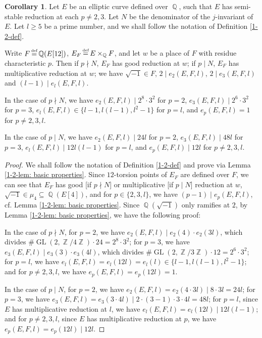 \documentclass[a4paper, 12pt]{article}
\DeclareMathOperator{\defeq}{\overset{\text{\tiny{def}}}{=}}
\DeclareMathOperator{\Z}{\mathbb{Z}}
\DeclareMathOperator{\Q}{\mathbb{Q}}
\DeclareMathOperator{\GL}{\text{GL}}
\numberwithin{equation}{section}
\theoremstyle{definition}
\newtheorem{cor}[thm]{Corollary}
\begin{document}
\begin{cor} \label{1-2-cor0}
Let $E$ be an elliptic curve defined over $\Q$, such that $E$ has semi-stable reduction at each $p\neq 2,3$.
Let $N$ be the denominator of the $j$-invariant of $E$.
Let $l\ge 5$ be a prime number, and we shall follow the notation of Definition \ref{1-2-def}.

Write $F\defeq \Q(E[12])$, $E_F \defeq E\times_{\Q} F$, and let $w$ be a place of $F$ with residue characteristic $p$. 
Then if $p \nmid N$, $E_F$ has good reduction at $w$; if $p \mid N$, $E_F$ has multiplicative reduction at $w$; we have $\sqrt{-1} \in F$, $2\mid e_2(E,F,l)$, $2\mid e_3(E,F,l)$ and $(l-1) \mid e_l(E,F,l)$.

In the case of $p \nmid N$, we have 
$e_2(E,F,l) \mid 2^8\cdot 3^2$ for $p=2$, $e_3(E,F,l) \mid 2^6\cdot 3^2$ for $p=3$, 
$e_l(E,F,l) \in \{l-1, l(l-1), l^2-1\}$ for $p=l$, and $e_p(E,F,l) = 1$ for $p\neq 2,3,l$.
 
In the case of $p \mid N$, we have
$e_2(E,F,l) \mid 24l$ for $p=2$, $e_3(E,F,l) \mid 48l$ for $p=3$, 
$e_l(E,F,l) \mid 12 l (l-1)$ for $p=l$, 
and $e_p(E,F,l) \mid 12l$ for $p\neq 2,3,l$.
\end{cor}
\begin{proof}
We shall follow the notation of Definition \ref{1-2-def} and prove via Lemma \ref{1-2-lem: basic properties}.
Since $12$-torsion points of $E_F$ are defined over $F$, we can see that $E_F$ has good [if $p\nmid N$] or multiplicative [if $p\mid N$] reduction at $w$, $\sqrt{-1}\in \mu_4 \subseteq \Q(E[4])$, and for $p\in\{2,3,l\}$, we have $(p-1) \mid e_p(E,F,l)$, cf.  Lemma \ref{1-2-lem: basic properties}.
Since $\Q(\sqrt{-1})$ only ramifies at $2$, by Lemma \ref{1-2-lem: basic properties}, we have the following proof:

In the case of $p\nmid N$, 
for $p=2$, we have $e_2(E,F,l) \mid e_2(4) \cdot e_2(3l)$, which divides $\#\GL(2,\Z/4\Z) \cdot 24 = 2^8 \cdot 3^2$;
for $p=3$, we have  $e_3(E,F,l) \mid e_3(3) \cdot e_3(4l)$, which divides $\#\GL(2,\Z/3\Z) \cdot 12 = 2^6 \cdot 3^2$;
for $p=l$, we have $e_l(E,F,l) = e_l(12l) = e_l(l) \in \{ l-1, l(l-1), l^2-1\}$;
and for $p\neq 2,3,l$, we have $e_p(E,F,l) = e_p(12l) = 1$.

In the case of $p\mid N$, 
for $p=2$, we have $e_2(E,F,l) = e_2(4\cdot 3l) \mid 8 \cdot 3l = 24l$;
for $p=3$, we have $e_3(E,F,l) = e_3(3\cdot 4l) \mid 2\cdot (3-1)\cdot 3 \cdot 4l = 48l$;
for $p=l$, since $E$ has multiplicative reduction at $l$, we have $e_l(E,F,l) = e_l(12l) \mid 12 l (l-1)$;
and for $p\neq 2,3,l$, since $E$ has multiplicative reduction at $p$, we have $e_p(E,F,l) = e_p(12l) \mid 12l$.
\end{proof}
\end{document}
